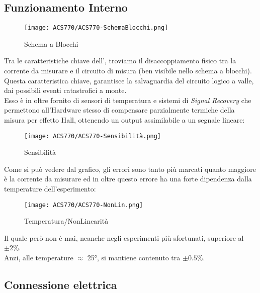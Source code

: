 \subsection{Funzionamento Interno}
\vspace{-5mm}
\begin{figure}[H]
	\centering
	\caption[ Schema a Blocchi]{Schema a Blocchi}
	\texttt{[image: ACS770/ACS770-SchemaBlocchi.png]}
\end{figure}
\noindent
Tra le caratteristiche chiave dell'\cite{ACS770}, troviamo il disaccoppiamento fisico tra la corrente da misurare e il circuito di misura (ben visibile nello schema a blocchi). Questa caratteristica chiave, garantisce la salvaguardia del circuito logico a valle, dai possibili eventi catastrofici a monte.\\
Esso è in oltre fornito di sensori di temperatura e sistemi di \textit{Signal Recovery} che permettono all'Hardware stesso di compensare parzialmente \nonLinearita termiche della misura per effetto Hall, ottenendo un output assimilabile a un segnale lineare:
\newpage
\begin{figure}[H]
	\centering
	\caption[ Sensibilità rispetto Temperatura]{Sensibilità}
	\texttt{[image: ACS770/ACS770-Sensibilità.png]}
\end{figure}
\vspace{-5mm}
\noindent
Come si può vedere dal grafico, gli errori sono tanto più marcati quanto maggiore è la corrente da misurare ed in oltre questo errore ha una forte dipendenza dalla temperature dell'esperimento:\\\vspace{-12mm}
\begin{figure}[H]
	\centering
	\caption[ \nonLinearita]{Temperatura/NonLinearità}
	\vspace{1mm}
	\texttt{[image: ACS770/ACS770-NonLin.png]}
\end{figure}\vspace{-6mm}

\noindent
Il quale però non è mai, neanche negli esperimenti più sfortunati, superiore al $\pm2\%$.\\
Anzi, alle temperature $\approx$ 25°, si mantiene contenuto tra $\pm0.5\%$.

\newpage

\subsection{Connessione elettrica}

